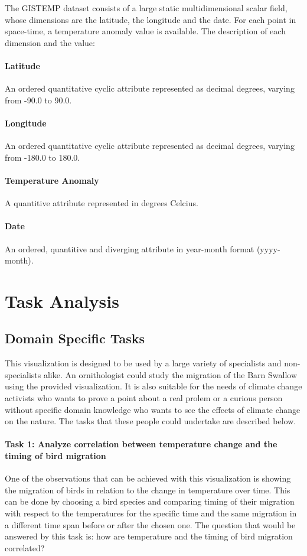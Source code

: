 \documentclass[journal]{vgtc}                %
\begin{document}
The GISTEMP dataset \cite{gistemp} consists of a large static multidimensional scalar field, whose dimensions are the latitude, the longitude and the date. For each point in space-time, a temperature anomaly value is available. The description of each dimension and the value:

\paragraph{Latitude} An ordered quantitative cyclic attribute represented as decimal degrees, varying from -90.0 to 90.0.

\paragraph{Longitude} An ordered quantitative cyclic attribute represented as decimal degrees, varying from -180.0 to 180.0.

\paragraph{Temperature Anomaly} A quantitive attribute represented in degrees Celcius.

\paragraph{Date} An ordered, quantitive and diverging attribute in year-month format (yyyy-month).

\section{Task Analysis}
\label{tasks}

\subsection{Domain Specific Tasks}

This visualization is designed to be used by a large variety of specialists and non-specialists alike. An ornithologist could study the migration of the Barn Swallow using the provided visualization. It is also suitable for the needs of climate  change activists who wants to prove a point about a real prolem or a curious person without specific domain knowledge who wants to see the effects of climate change on the nature. The tasks that  these people could undertake are described below.

\paragraph{Task 1: Analyze correlation between temperature change and the timing of bird migration} One of the observations that can be achieved with this visualization is showing the migration of birds in relation to the change in temperature over time. This can be done by choosing a bird species and comparing timing of their migration with respect to the temperatures for the specific time and the same migration in a different time span before or after the chosen one.  The question that would be answered by this task is: how are temperature and the timing of bird migration correlated?
\end{document}
